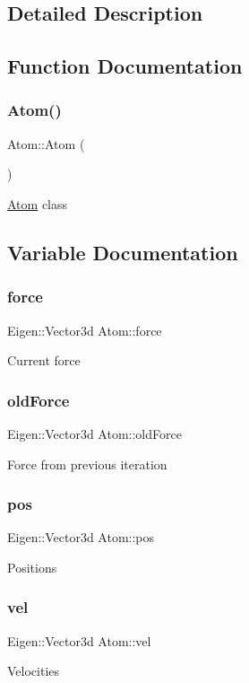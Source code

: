\subsection{Detailed Description}


\subsection{Function Documentation}
\mbox{\label{group___atom_gaa0147d7e49ab90f559b66e38d3d12863}} 
\subsubsection{\texorpdfstring{Atom()}{Atom()}}
{\footnotesize\ttfamily Atom\+::\+Atom (\begin{DoxyParamCaption}{ }\end{DoxyParamCaption})}

\mbox{\hyperlink{class_atom}{Atom}} class 

\subsection{Variable Documentation}
\mbox{\label{group___atom_ga33b530b8900b57bfa933ae79c7e95d71}} 
\subsubsection{\texorpdfstring{force}{force}}
{\footnotesize\ttfamily Eigen\+::\+Vector3d Atom\+::force}

Current force \mbox{\label{group___atom_gaf5b2daf8c6f32465b0ab1aecab57915b}} 
\subsubsection{\texorpdfstring{old\+Force}{oldForce}}
{\footnotesize\ttfamily Eigen\+::\+Vector3d Atom\+::old\+Force}

Force from previous iteration \mbox{\label{group___atom_ga9c44a53717ca3857065c0a36787359e1}} 
\subsubsection{\texorpdfstring{pos}{pos}}
{\footnotesize\ttfamily Eigen\+::\+Vector3d Atom\+::pos}

Positions \mbox{\label{group___atom_gaabc1e87e4ed861ae02f781d3f43d8481}} 
\subsubsection{\texorpdfstring{vel}{vel}}
{\footnotesize\ttfamily Eigen\+::\+Vector3d Atom\+::vel}

Velocities 